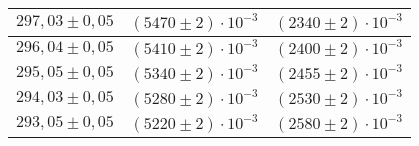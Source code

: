 \begin{tabular}{|l|l|l|}
$297{,}03 \pm 0{,}05$ & $\left(5470 \pm 2\right)\cdot 10^{-3}$ & $\left(2340 \pm 2\right)\cdot 10^{-3}$\\\hline
$296{,}04 \pm 0{,}05$ & $\left(5410 \pm 2\right)\cdot 10^{-3}$ & $\left(2400 \pm 2\right)\cdot 10^{-3}$\\\hline
$295{,}05 \pm 0{,}05$ & $\left(5340 \pm 2\right)\cdot 10^{-3}$ & $\left(2455 \pm 2\right)\cdot 10^{-3}$\\\hline
$294{,}03 \pm 0{,}05$ & $\left(5280 \pm 2\right)\cdot 10^{-3}$ & $\left(2530 \pm 2\right)\cdot 10^{-3}$\\\hline
$293{,}05 \pm 0{,}05$ & $\left(5220 \pm 2\right)\cdot 10^{-3}$ & $\left(2580 \pm 2\right)\cdot 10^{-3}$\\\hline
\end{tabular}

